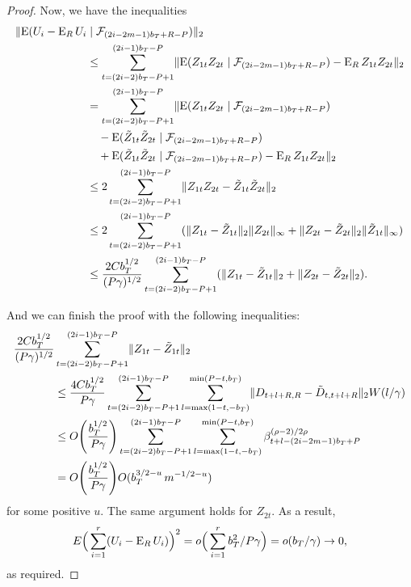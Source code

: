 \documentclass[11pt]{article}
\begin{document}
\begin{proof}
Now, we have the inequalities
\begin{align*}
  \lVert \operatorname{E}( U_i - \operatorname{E}_R U_i & \mid \mathcal{F}_{(2i-2m-1)b_{T}+R-P}) \rVert_2
  \\ &\leq
  \sum_{t=(2i-2)b_T-P+1}^{(2i-1)b_T-P} \lVert \operatorname{E}(Z_{1t}Z_{2t} \mid \mathcal{F}_{(2i-2m-1)b_{T}+R-P}) - \operatorname{E}_R
  Z_{1t}Z_{2t} \rVert_2 \\
  &= \sum_{t=(2i-2)b_T-P+1}^{(2i-1)b_T-P} \lVert \operatorname{E}(Z_{1t}Z_{2t} \mid \mathcal{F}_{(2i-2m-1)b_{T}+R-P}) \\
  &\quad - \operatorname{E}(\tilde{Z}_{1t}\tilde{Z}_{2t} \mid \mathcal{F}_{(2i-2m-1)b_{T}+R-P}) \\
  &\quad + \operatorname{E}(\tilde{Z}_{1t}\tilde{Z}_{2t} \mid \mathcal{F}_{(2i-2m-1)b_{T}+R-P})
  - \operatorname{E}_R Z_{1t}Z_{2t} \rVert_2 \\
  &\leq 2 \sum_{t=(2i-2)b_T-P+1}^{(2i-1)b_T-P} \lVert Z_{1t} Z_{2t} - \tilde Z_{1t} \tilde{Z}_{2t}
  \rVert_2 \\
  &\leq 2 \sum_{t=(2i-2)b_T-P+1}^{(2i-1)b_T-P} (\lVert Z_{1t} - \tilde{Z}_{1t} \rVert_2 \lVert
  Z_{2t} \rVert_{\infty}
  + \lVert Z_{2t} - \tilde{Z}_{2t} \rVert_2 \lVert \tilde{Z}_{1t} \rVert_{\infty}) \\
  &\leq \frac{2 C b_T^{1/2}}{(P\gamma)^{1/2}} \sum_{t=(2i-2)b_T-P+1}^{(2i-1)b_T-P} (\lVert Z_{1t} - \tilde{Z}_{1t} \rVert_2 
  + \lVert Z_{2t} - \tilde{Z}_{2t} \rVert_2).
\end{align*}

And we can finish the proof with the following inequalities:
\begin{align*}
  \frac{2 C b_T^{1/2}}{(P \gamma)^{1/2}} &\sum_{t=(2i-2)b_T-P+1}^{(2i-1)b_T-P} \lVert Z_{1t} - \tilde{Z}_{1t} \rVert_2 \\& \leq
  \frac{4C b_T^{1/2}}{P\gamma} \sum_{t=(2i-2)b_T-P+1}^{(2i-1)b_T-P} \sum_{l=\max(1-t,-b_T)}^{\min(P-t,b_T)} \lVert
  D_{t+l+R,R} - \tilde{D}_{t,t+l+R} \rVert_2 W(l/\gamma) \\&
  \leq O\Bigg(\frac{b_T^{1/2}}{P\gamma}\Bigg) \sum_{t=(2i-2)b_T-P+1}^{(2i-1)b_T-P}
  \sum_{l=\max(1-t,-b_T)}^{\min(P-t,b_T)} \beta^{(\rho-2)/2\rho}_{t+l-(2i-2m-1)b_T+P}\\&
  = O\Bigg(\frac{b_T^{1/2}}{P\gamma}\Bigg) O(b_T^{3/2-u}\, m^{-1/2-u})
\end{align*}
for some positive $u$.  The same argument holds for $Z_{2t}$.
As a result,
\[
E\Big(\sum_{i=1}^r (U_i - \operatorname{E}_R U_i)\Big)^2 = o\Big(\sum_{i=1}^r b_T^2/P\gamma\Big) =
 o(b_T/\gamma) \to 0,
\]
as required.
\end{proof}
\end{document}
